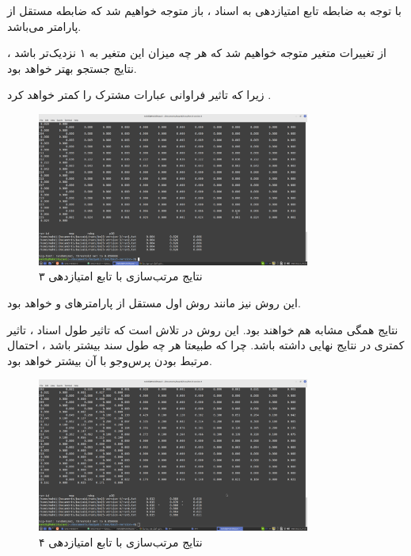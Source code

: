 \begin{boxM}
    با توجه به ضابطه تابع امتیازدهی به اسناد ، باز متوجه خواهیم شد که ضابطه مستقل از پارامتر
    می‌باشد.

    از تغییرات متغیر
    متوجه خواهیم شد که هر چه میزان این متغیر به ۱ نزدیک‌تر باشد ، 
    نتایج جستجو بهتر خواهد بود.

    زیرا که تاثیر فراوانی عبارات مشترک را کمتر خواهد کرد .
\end{boxM}

\newpage

\begin{figure}[h]
    \centering
    \includegraphics[width=0.8\textwidth]{IR1/images/V3.png}
    \caption{نتایج مرتب‌سازی با تابع امتیازدهی ۳}
    \label{fig:enter-label}
\end{figure}

\begin{boxM}
    این روش نیز مانند روش اول 
    مستقل از پارامترهای 
    و 
    خواهد بود.

    نتایج همگی مشابه هم خواهند بود.
    این روش در تلاش است که تاثیر طول اسناد ، تاثیر کمتری در نتایج نهایی داشته باشد.
    چرا که طبیعتا هر چه طول سند بیشتر باشد ، احتمال مرتبط بودن پرس‌وجو با آن بیشتر خواهد بود.
\end{boxM}

\newpage

\begin{figure}
    \centering
    \includegraphics[width=0.8\textwidth]{IR1/images/V4.png}
    \caption{نتایج مرتب‌سازی با تابع امتیازدهی ۴}
    \label{fig:enter-label}
\end{figure}

